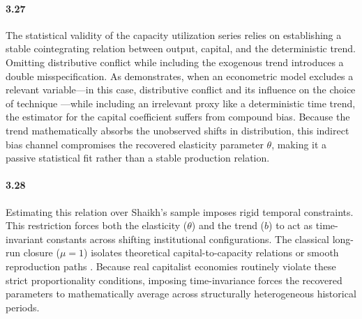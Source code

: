 \paragraph{3.27}
The statistical validity of the capacity utilization series relies on establishing a stable cointegrating relation between output, capital, and the deterministic trend. Omitting distributive conflict while including the exogenous trend introduces a double misspecification. As \citet{Basu2020} demonstrates, when an econometric model excludes a relevant variable—in this case, distributive conflict and its influence on the choice of technique \citep{Kurz1986}—while including an irrelevant proxy like a deterministic time trend, the estimator for the capital coefficient suffers from compound bias. Because the trend mathematically absorbs the unobserved shifts in distribution, this indirect bias channel compromises the recovered elasticity parameter $\theta$, making it a passive statistical fit rather than a stable production relation.

\paragraph{3.28}
Estimating this relation over Shaikh's sample imposes rigid temporal constraints. This restriction forces both the elasticity ($\theta$) and the trend ($b$) to act as time-invariant constants across shifting institutional configurations. The classical long-run closure ($\mu = 1$) isolates theoretical capital-to-capacity relations \citep{Foley1985} or smooth reproduction paths \citep{Okishio2022, Basu2022}. Because real capitalist economies routinely violate these strict proportionality conditions, imposing time-invariance forces the recovered parameters to mathematically average across structurally heterogeneous historical periods.

